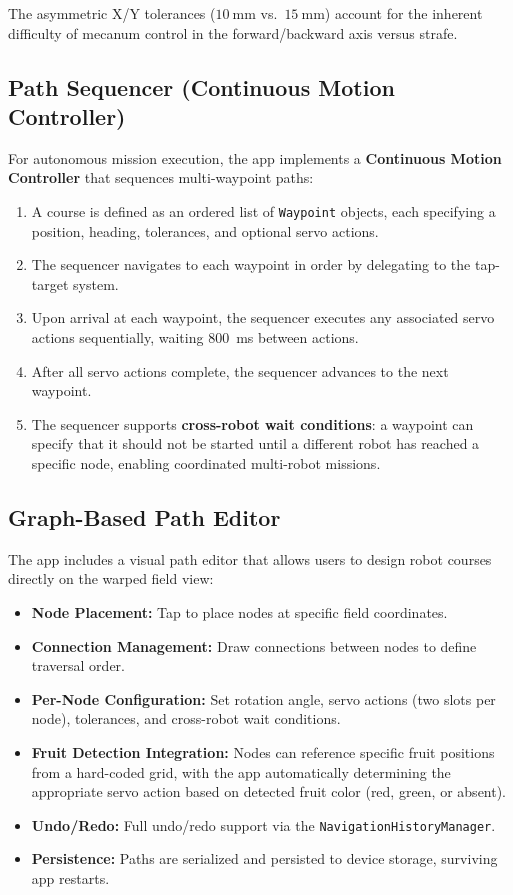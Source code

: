 \documentclass[12pt, a4paper, twoside]{article}
\begin{document}
The asymmetric X/Y tolerances ($\SI{10}{\milli\metre}$ vs.\ $\SI{15}{\milli\metre}$) account for the inherent difficulty of mecanum control in the forward/backward axis versus strafe.

\subsection{Path Sequencer (Continuous Motion Controller)}

For autonomous mission execution, the app implements a \textbf{Continuous Motion Controller} that sequences multi-waypoint paths:

\begin{enumerate}
    \item A course is defined as an ordered list of \texttt{Waypoint} objects, each specifying a position, heading, tolerances, and optional servo actions.
    \item The sequencer navigates to each waypoint in order by delegating to the tap-target system.
    \item Upon arrival at each waypoint, the sequencer executes any associated servo actions sequentially, waiting \SI{800}{\milli\second} between actions.
    \item After all servo actions complete, the sequencer advances to the next waypoint.
    \item The sequencer supports \textbf{cross-robot wait conditions}: a waypoint can specify that it should not be started until a different robot has reached a specific node, enabling coordinated multi-robot missions.
\end{enumerate}

\subsection{Graph-Based Path Editor}

The app includes a visual path editor that allows users to design robot courses directly on the warped field view:

\begin{itemize}
    \item \textbf{Node Placement:} Tap to place nodes at specific field coordinates.
    \item \textbf{Connection Management:} Draw connections between nodes to define traversal order.
    \item \textbf{Per-Node Configuration:} Set rotation angle, servo actions (two slots per node), tolerances, and cross-robot wait conditions.
    \item \textbf{Fruit Detection Integration:} Nodes can reference specific fruit positions from a hard-coded grid, with the app automatically determining the appropriate servo action based on detected fruit color (red, green, or absent).
    \item \textbf{Undo/Redo:} Full undo/redo support via the \texttt{NavigationHistoryManager}.
    \item \textbf{Persistence:} Paths are serialized and persisted to device storage, surviving app restarts.
\end{itemize}
\end{document}
